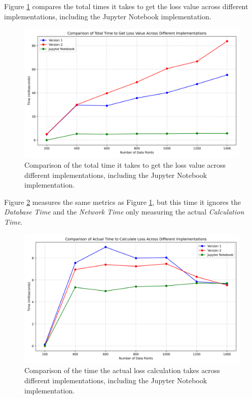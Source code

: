 \documentclass[
  a4paper,  %
  twoside,  %
  bibliography=totoc,
  headsepline,
  cleardoublepage=empty,
  parskip=half,
  draft=false
]{scrbook}
\begin{document}
Figure \ref{fig:coparison_of_of} compares the total times it takes to get the loss value across different implementations, including the Jupyter Notebook implementation.

\begin{figure}
  \centering
  \includegraphics[width=\textwidth]{graphics/comparison_of_of.png}
  \caption{Comparison of the total time it takes to get the loss value across different implementations, including the Jupyter Notebook implementation.}
  \label{fig:coparison_of_of}
\end{figure}

Figure \ref{fig:time_for_of_calc} measures the same metrics as Figure \ref{fig:coparison_of_of}, but this time it ignores the \emph{Database Time} and the \emph{Network Time} only measuring the actual \emph{Calculation Time}.

\begin{figure}
  \centering
  \includegraphics[width=\textwidth]{graphics/time_for_of_calc.png}
  \caption{Comparison of the time the actual loss calculation takes across different implementations, including the Jupyter Notebook implementation.}
  \label{fig:time_for_of_calc}
\end{figure}
\end{document}
